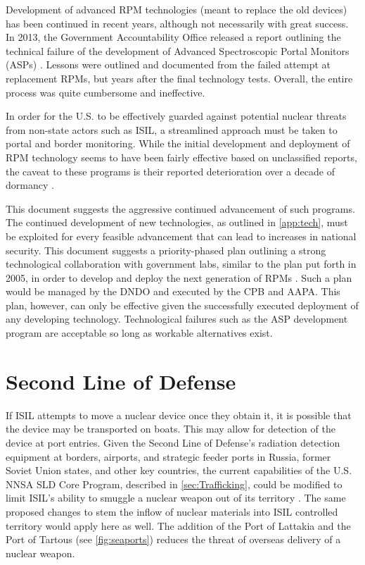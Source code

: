 \documentclass{report}
\begin{document}
Development of advanced RPM technologies (meant to replace the old devices) has been continued in recent years, although not necessarily with great success. In 2013, the Government Accountability Office released a report outlining the technical failure of the development of Advanced Spectroscopic Portal Monitors (ASPs) \cite{UnitedStatesGovernmentAccountabilityOffice2013}. Lessons were outlined and documented from the failed attempt at replacement RPMs, but years after the final technology tests. Overall, the entire process was quite cumbersome and ineffective. 

In order for the U.S. to be effectively guarded against potential nuclear threats from non-state actors such as ISIL, a streamlined approach must be taken to portal and border monitoring. While the initial development and deployment of RPM technology seems to have been fairly effective based on unclassified reports, the caveat to these programs is their reported deterioration over a decade of dormancy \cite{Simmons2005,DepartmentofHomelandSecurityDHS2013}. 

This document suggests the aggressive continued advancement of such programs. The continued development of new technologies, as outlined in \autoref{app:tech}, must be exploited for every feasible advancement that can lead to increases in national security. This document suggests a priority-phased plan outlining a strong technological collaboration with government labs, similar to the plan put forth in 2005, in order to develop and deploy the next generation of RPMs \cite{Simmons2005}. Such a plan would be managed by the DNDO and executed by the CPB and AAPA. This plan, however, can only be effective given the successfully executed deployment of any developing technology. Technological failures such as the ASP development program are acceptable so long as workable alternatives exist. 



\section{Second Line of Defense}

If ISIL attempts to move a nuclear device once they obtain it, it is possible that the device may be transported on boats. This may allow for detection of the device at port entries. Given the Second Line of Defense's radiation detection equipment at borders, airports, and strategic feeder ports in Russia, former Soviet Union states, and other key countries, the current capabilities of the U.S. NNSA SLD Core Program, described in \autoref{sec:Trafficking}, could be modified to limit ISIL's ability to smuggle a nuclear weapon out of its territory \cite{Kilmartin2010}. The same proposed changes to stem the inflow of nuclear materials into ISIL controlled territory would apply here as well. The addition of the Port of Lattakia and the Port of Tartous (see \autoref{fig:seaports}) reduces the threat of overseas delivery of a nuclear weapon.   
\end{document}
